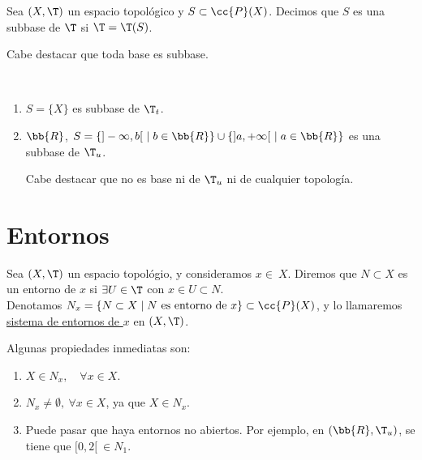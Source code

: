 \begin{definicion}
    Sea $(X,\T)$ un espacio topológico y $S\subset \cc{P}(X)$. Decimos que $S$ es una subbase de $\T$ si $\T=\T(S)$.
\end{definicion}

Cabe destacar que toda base es subbase.

\begin{ejemplo}\
\begin{enumerate}
    \item $S=\{X\}$ es subbase de $\T_t$.
    \item $\bb{R}$, $S=\{]-\infty, b[~\mid b\in \bb{R}\} \cup \{]a,+\infty[~\mid a\in \bb{R}\}$ es una subbase de $\T_u$.

    Cabe destacar que no es base ni de $\T_u$ ni de cualquier topología.
\end{enumerate}
\end{ejemplo}

\section{Entornos}
\begin{definicion}[Entornos]
    Sea $(X,\T)$ un espacio topológio, y consideramos $x\in~X$. Diremos que $N\subset X$ es un entorno de $x$ si $\exists U\in \T$ con $x\in U\subset N$.\\

    Denotamos $N_x = \{N\subset X\mid N \text{ es entorno de $x$}\}\subset \cc{P}(X)$, y lo llamaremos \ul{sistema de entornos de $x$} en $(X,\T)$.
\end{definicion}

Algunas propiedades inmediatas son:
\begin{enumerate}
    \item $X\in N_x,\quad \forall x\in X$.
    \item $N_x\neq \emptyset,~\forall x\in X$, ya que $X\in N_x$.
    \item Puede pasar que haya entornos no abiertos. Por ejemplo, en $(\bb{R}, \T_u)$, se tiene que $[0,2[~\in N_1$.
\end{enumerate}

